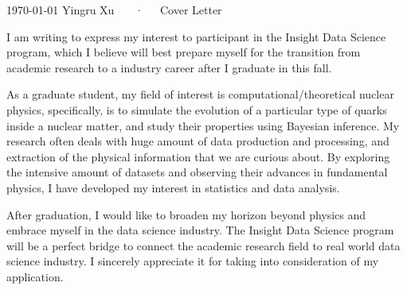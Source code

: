 \documentclass[11pt, letterpaper]{awesome-cv}
\begin{document}
\makecvheader[R]

\makecvfooter
  {\today}
  {Yingru Xu ~~~·~~~Cover Letter}
  {}

\makelettertitle

\begin{cvletter}

I am writing to express my interest to participant in the Insight Data Science program, which I believe will best prepare myself for the transition from academic research to a industry career after I graduate in this fall.

As a graduate student, my field of interest is computational/theoretical nuclear physics, specifically, is to simulate the evolution of a particular type of quarks inside a nuclear matter, and study their properties using Bayesian inference. My research often deals with huge amount of data production and processing, and extraction of the physical information that we are curious about. By exploring the intensive amount of datasets and observing their advances in fundamental physics, I have developed my interest in statistics and data analysis.

After graduation, I would like to broaden my horizon beyond physics and embrace myself in the data science industry. The Insight Data Science program will be a perfect bridge to connect the academic research field to real world data science industry. I sincerely appreciate it for taking into consideration of my application.



\end{cvletter}


\makeletterclosing
\end{document}

